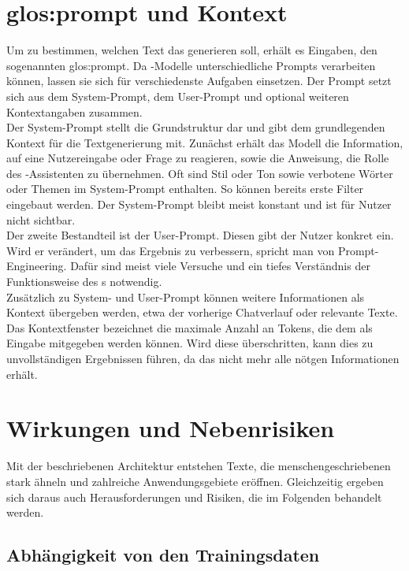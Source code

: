 \documentclass[../main.tex]{subfiles}
\begin{document}
\section{\gls{glos:prompt} und Kontext}

Um zu bestimmen, welchen Text das  generieren soll, erhält es Eingaben, den sogenannten \gls{glos:prompt}. Da -Modelle unterschiedliche Prompts 
verarbeiten können, lassen sie sich für verschiedenste Aufgaben einsetzen. Der Prompt setzt sich aus dem System-Prompt, dem User-Prompt und optional weiteren Kontextangaben zusammen.\cite{systemprompt}\\
Der System-Prompt stellt die Grundstruktur dar und gibt dem  grundlegenden Kontext für die Textgenerierung mit. Zunächst erhält das Modell die Information, auf eine 
Nutzereingabe oder Frage zu reagieren, sowie die Anweisung, die Rolle des -Assistenten zu übernehmen. Oft sind Stil oder Ton sowie verbotene Wörter oder Themen im System-Prompt 
enthalten. So können bereits erste Filter eingebaut werden.\cite{systemprompt} Der System-Prompt bleibt meist konstant und ist für Nutzer nicht sichtbar.\\
Der zweite Bestandteil ist der User-Prompt. Diesen gibt der Nutzer konkret ein. Wird er verändert, um das Ergebnis zu verbessern, spricht man von Prompt-Engineering. 
Dafür sind meist viele Versuche und ein tiefes Verständnis der Funktionsweise des s notwendig.\cite{promptengineering}\\
Zusätzlich zu System- und User-Prompt können weitere Informationen als Kontext übergeben werden, etwa der vorherige Chatverlauf oder relevante Texte. 
Das Kontextfenster bezeichnet die maximale Anzahl an Tokens, die dem  als Eingabe mitgegeben werden können. Wird diese überschritten, kann dies zu unvollständigen 
Ergebnissen führen, da das  nicht mehr alle nötgen Informationen erhält.

\section{Wirkungen und Nebenrisiken}
Mit der beschriebenen Architektur entstehen Texte, die menschengeschriebenen stark ähneln und zahlreiche Anwendungsgebiete eröffnen. Gleichzeitig ergeben sich daraus auch Herausforderungen und Risiken, 
die im Folgenden behandelt werden.

\subsection{Abhängigkeit von den Trainingsdaten}
\end{document}
